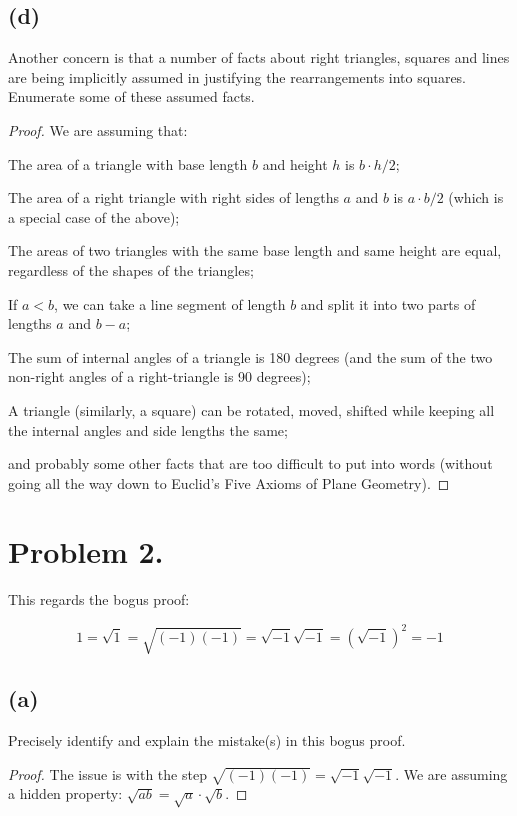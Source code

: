 \documentclass[14pt]{extarticle}
\begin{document}
\subsection{(d)}

Another concern is that a number of facts about right triangles, squares and lines are being implicitly assumed in justifying the rearrangements into squares. Enumerate some of these assumed facts.

\begin{proof}
We are assuming that:

The area of a triangle with base length $b$ and height $h$ is $b \cdot h / 2$;

The area of a right triangle with right sides of lengths $a$ and $b$ is $a\cdot b / 2$ (which is a special case of the above);

The areas of two triangles with the same base length and same height are equal, regardless of the shapes of the triangles;

If $a < b$, we can take a line segment of length $b$ and split it into two parts of lengths $a$ and $b - a$;

The sum of internal angles of a triangle is 180 degrees (and the sum of the two non-right angles of a right-triangle is 90 degrees);

A triangle (similarly, a square) can be rotated, moved, shifted while keeping all the internal angles and side lengths the same;

and probably some other facts that are too difficult to put into words (without going all the way down to Euclid's Five Axioms of Plane Geometry).
\end{proof}

\section{Problem 2.}
This regards the bogus proof:

$$
1 = \sqrt{1} = \sqrt{(-1)(-1)} = \sqrt{-1}\sqrt{-1} = (\sqrt{-1})^2 = -1
$$

\subsection{(a)}

Precisely identify and explain the mistake(s) in this bogus proof.

\begin{proof}
The issue is with the step $\sqrt{(-1)(-1)} = \sqrt{-1}\sqrt{-1}$. We are assuming a hidden property: $\sqrt{ab} = \sqrt{a}\cdot\sqrt{b}$.
\end{proof}
\end{document}
